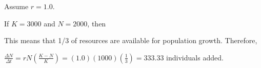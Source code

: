 \documentclass[t,handout]{beamer}  %
\begin{document}
%
\begin{frame}
	\hangpara Assume $r = 1.0$.
	
	\hangpara If $K = 3000$ and $N = 2000$, \pause then
	
	
	\hangpara This means that 1/3 of resources are available for population growth. \pause Therefore,
	
	\hangpara $\frac{\Delta N}{\Delta t} = rN\left(\frac{K-N}{K}\right) = (1.0)(1000)(\frac{1}{3}) = 333.33$ individuals added.
\end{frame}
%
{
\begin{frame}
\end{frame}
}
%
\end{document}
